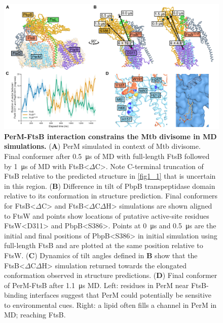 \documentclass[twocolumn,pdflatex,sn-nature]{sn-jnl}%
\def\textsuperscript#1{<#1>}%
\newcommand\mtb{Mtb}
\newcommand\ftsbdCdH{FtsB\textsuperscript{$\Delta{}$C$\Delta{}$H}}
\newcommand\ftsbdC{FtsB\textsuperscript{$\Delta{}$C}}
\begin{document}
\begin{figure}[htb]
    \centering
    \includegraphics[width=1.0\textwidth]{../figures/fig5.png}
    \caption{
        \textbf{PerM-FtsB interaction constrains the \mtb{} divisome in MD simulations.}
        (\textbf{A}) PerM simulated in context of \mtb{} divisome. Final conformer after \qty{0.5}{\us} of MD with full-length FtsB followed by \qty{1}{\us} of MD with \ftsbdC{}. Note C-terminal truncation of FtsB relative to the predicted structure in \ref{fig1_1} that is uncertain in this region.
        (\textbf{B}) Difference in tilt of PbpB transpeptidase domain relative to its conformation in structure prediction. Final conformers for \ftsbdC{} and \ftsbdCdH{} simulations are shown aligned to FtsW and points show locations of putative active-site residues FtsW\textsuperscript{D311} and PbpB\textsuperscript{S386}. Points at \qty{0}{\us} and \qty{0.5}{\us} are the initial and final positions of PbpB\textsuperscript{S386} in initial simulation using full-length FtsB and are plotted at the same position relative to FtsW.
        (\textbf{C}) Dynamics of tilt angles defined in \textbf{B} show that the \ftsbdCdH{} simulation returned towards the elongated conformation observed in structure predictions. (\textbf{D}) Final conformer of PerM-FtsB after \qty{1.1}{\us} MD. Left: residues in PerM near FtsB-binding interfaces suggest that PerM could potentially be sensitive to environmental cues. Right: a lipid often fills a channel in PerM in MD;  reaching FtsB.
    }\label{fig5}
\end{figure}
\end{document}
